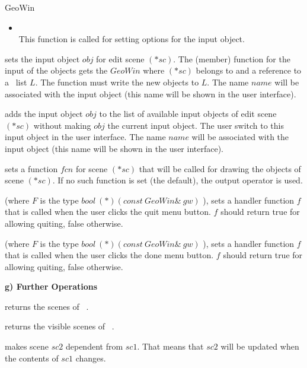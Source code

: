 \begin{ccRefClass}{GeoWin}
\begin{itemize}
        \item {} \\  
     This function is called for setting options for the input object.
\end{itemize}
     
{sets the input object $obj$ for edit scene $(*sc)$. 
The (member) function for the input of the objects gets the $GeoWin$ where $(*sc)$ belongs to and
a reference to a \leda\ list $L$. The function must write the new objects to $L$. The name $name$ will
be associated with the input object (this name will be shown in the user interface).}

  
{adds the input object $obj$ to the list of available input objects of edit scene $(*sc)$ without making 
$obj$ the current input object. The user switch to this input object in the user interface. The name $name$ will
be associated with the input object (this name will be shown in the user interface).}

{sets a function $fcn$ for scene $(*sc)$ that will be called for drawing the objects of scene $(*sc)$. 
If no such function is set (the default), the output operator is used.}


{
(where $F$ is the type 
$bool \ (*)(const \ GeoWin\& \ gw)$ ),
sets a handler function $f$ that is called when the user 
clicks the quit menu button. $f$ should return true for allowing quiting, false otherwise. }
  
{
(where $F$ is the type 
$bool \ (*)(const \ GeoWin\& \ gw)$ ),
sets a handler function $f$ that is called when the user clicks the
done menu button. $f$ should return true for allowing quiting, false otherwise. }

\medskip
{\bf g) Further Operations} 

{returns the scenes of \ccVar\ .}
  
{returns the visible scenes of \ccVar\ .}

{makes scene $sc2$ dependent from $sc1$. That means that $sc2$
will be updated when the contents of $sc1$ changes. }


\end{ccRefClass}
